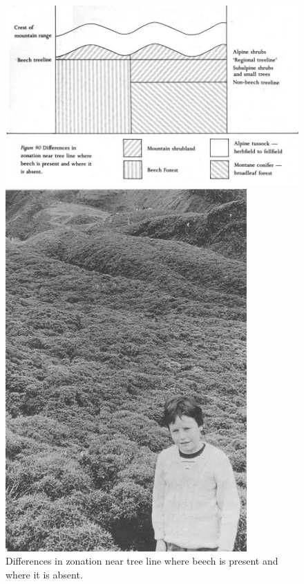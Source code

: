 \begin{figure}[htb]
	\centering
	\begin{minipage}[t]{0.696\textwidth}
		\centering
		\includegraphics[width=\textwidth]{graphics/figure90zonation.jpg}
    	\caption[Differences in zonation]{Differences in zonation near tree line where beech is present and where it is absent.}%
    	\label{fig:90zonation}
	\end{minipage}\hfill%
	\begin{minipage}[t]{0.284\textwidth}
    	\centering
    	\includegraphics[width=\textwidth]{graphics/figure91shrubland.jpg}

\end{minipage}
\end{figure}
